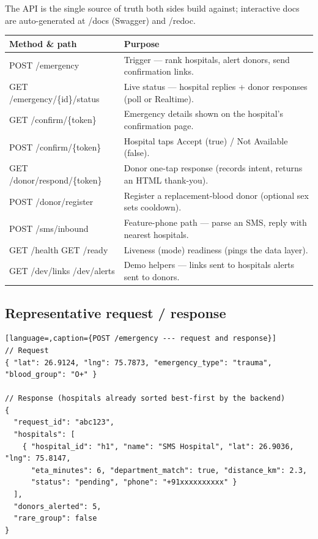 \documentclass[11pt]{article}
\newcommand{\code}[1]{\colorbox{ghCodeBg}{\ttfamily\small #1}}
\begin{document}
The API is the single source of truth both sides build against; interactive docs
are auto-generated at \code{/docs} (Swagger) and \code{/redoc}.

\begin{center}
\begin{tabularx}{\textwidth}{@{}p{5.4cm} L@{}}
\toprule
\textbf{Method \& path} & \textbf{Purpose} \\
\midrule
\code{POST /emergency} & Trigger --- rank hospitals, alert donors, send confirmation links. \\
\code{GET /emergency/\{id\}/status} & Live status --- hospital replies + donor responses (poll or Realtime). \\
\code{GET /confirm/\{token\}} & Emergency details shown on the hospital's confirmation page. \\
\code{POST /confirm/\{token\}} & Hospital taps Accept (\code{true}) / Not Available (\code{false}). \\
\code{GET /donor/respond/\{token\}} & Donor one-tap response (records intent, returns an HTML thank-you). \\
\code{POST /donor/register} & Register a replacement-blood donor (optional \code{sex} sets cooldown). \\
\code{POST /sms/inbound} & Feature-phone path --- parse an SMS, reply with nearest hospitals. \\
\code{GET /health} \textbullet{} \code{GET /ready} & Liveness (mode) \textbullet{} readiness (pings the data layer). \\
\code{GET /dev/links} \textbullet{} \code{/dev/alerts} & Demo helpers --- links sent to hospitals \textbullet{} alerts sent to donors. \\
\bottomrule
\end{tabularx}
\end{center}

\subsection{Representative request / response}
\begin{lstlisting}[language=,caption={POST /emergency --- request and response}]
// Request
{ "lat": 26.9124, "lng": 75.7873, "emergency_type": "trauma", "blood_group": "O+" }

// Response (hospitals already sorted best-first by the backend)
{
  "request_id": "abc123",
  "hospitals": [
    { "hospital_id": "h1", "name": "SMS Hospital", "lat": 26.9036, "lng": 75.8147,
      "eta_minutes": 6, "department_match": true, "distance_km": 2.3,
      "status": "pending", "phone": "+91xxxxxxxxxx" }
  ],
  "donors_alerted": 5,
  "rare_group": false
}
\end{lstlisting}
\end{document}

